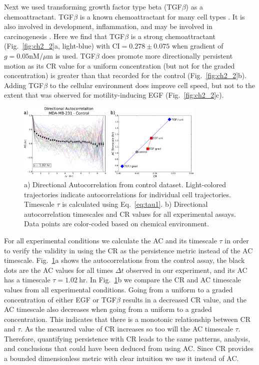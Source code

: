 Next we used transforming growth factor type beta (TGF$\beta$) as a chemoattractant. TGF$\beta$ is a known chemoattractant for many cell types \cite{wahl1987transforming,bischoff1997chemotaxis}.
It is also involved in development, inflammation, and may be involved in carcinogenesis \cite{clark1998molecules,javelaud2004mammalian,pang2016tgf}.
Here we find that TGF$\beta$ is a strong chemoattractant (Fig.\ \ref{fig:ch2_2}a, light-blue) with $\text{CI} = 0.278 \pm 0.075$ when gradient of
$g = 0.05 \text{nM} / \mu\text{m}$ is used.
TGF$\beta$ does promote more directionally persistent motion as its CR value for a uniform concentration (but not for the graded concentration) is greater than that recorded for the control (Fig.\ \ref{fig:ch2_2}b). Adding TGF$\beta$ to the cellular environment does improve cell speed, but not to the extent that was observed for motility-inducing EGF (Fig.\ \ref{fig:ch2_2}c).

\begin{figure}[ht]
    \centering
    \includegraphics[width=0.80\textwidth]{../fig/ch2_fig5.png}
    \caption{a) Directional Autocorrelation from control dataset. Light-colored trajectories indicate autocorrelations for individual cell trajectories. Timescale $\tau$ is calculated using Eq.\ \ref{eq:tau1}. b) Directional autocorrelation timescales and CR values for all experimental assays. Data points are color-coded based on chemical environment.} \label{fig:ch2_5}
\end{figure}

For all experimental conditions we calculate the AC and its timescale $\tau$ in order to verify the validity in using the CR as the persistence metric instead of the AC timescale. Fig.\ \ref{fig:ch2_5}a shows the autocorrelations from the control assay, the black dots are the AC values for all times $\Delta t$ observed in our experiment, and its AC has a timescale
$\tau = 1.02 \ \text{hr}$.
In Fig.\ \ref{fig:ch2_5}b we compare the CR and AC timescale values from all experimental conditions. Going from a uniform to a graded concentration of either EGF or TGF$\beta$ results in a decreased CR value, and the AC timescale also decreases when going from a uniform to a graded concentration. This indicates that there is a monotonic relationship between CR and $\tau$. As the measured value of CR increases so too will the AC timescale $\tau$.
Therefore, quantifying persistence with CR leads to the same patterns, analysis, and conclusions that could have been deduced from using AC. Since CR provides a bounded dimensionless metric with clear intuition we use it instead of AC.

